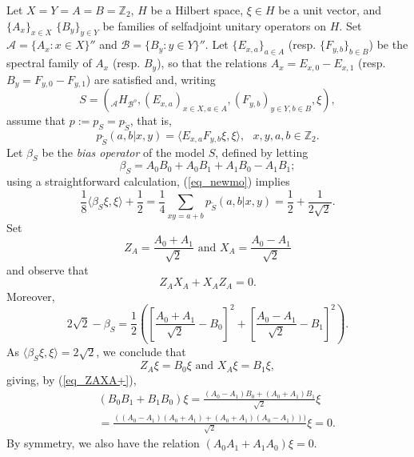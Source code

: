\documentclass[11pt]{amsart}
\theoremstyle{definition}
\newcommand{\cl}[1]{\mathcal{#1}}
\newcommand{\bb}[1]{\mathbb{#1}}
\DeclareMathOperator{\Tr}{Tr}
\begin{document}
Let $X=Y=A=B=\mathbb Z_2$, 
$H$ be a Hilbert space, $\xi\in H$ be a unit vector, 
and $\{A_x\}_{x\in X}$ $\{B_y\}_{y\in Y}$ be families of selfadjoint unitary 
operators on $H$. 
Set $\cl A=\{A_x:x\in X\}''$
and $\cl B=\{B_y:y\in Y\}''$.
Let
$\{E_{x,a}\}_{a\in A}$ (resp. $\{F_{y,b}\}_{b\in B}$) be the 
spectral family of $A_x$ (resp. $B_y$), so that the relations
$A_x=E_{x,0}-E_{x,1}$ (resp. $B_y=F_{y,0}-F_{y,1}$) are 
satisfied and, writing 
$$S=(\mbox{}_{\cl A}H_{\cl B^{o}}, (E_{x,a})_{x\in X,a\in A},(F_{y,b})_{y\in Y,b\in B},\xi),$$ assume that 
$p:=p_S = p_{\tilde{S}}$, that is,
\begin{equation}\label{eq_newmo}
p_{\tilde S}(a,b|x,y)=\langle E_{x,a}F_{y,b}\xi,\xi\rangle,
\ \ \ x,y,a,b\in \bb{Z}_2.
\end{equation}
Let
$\beta_{S}$  be the \emph{bias operator} of the model $S$, 
defined by letting
$$\beta_{S} = A_0 B_0+A_0B_1+A_1B_0-A_1 B_1;$$
using a straightforward calculation, (\ref{eq_newmo}) implies
$$\frac{1}{8}\langle\beta_{S}\xi,\xi\rangle+\frac{1}{2}=
\frac{1}{4}\sum_{xy = a+b} p_{\tilde S}(a,b|x,y)
=\frac{1}{2}+\frac{1}{2\sqrt{2}}.$$ 
Set 
\begin{equation}\label{eq_ZA=XA=}
Z_A=\frac{A_0+A_1}{\sqrt{2}}\text { and }X_A=\frac{A_0-A_1}{\sqrt{2}}
\end{equation}
and observe that 
\begin{equation}\label{eq_ZAXA+}
Z_AX_A+X_AZ_A=0.
\end{equation}
    Moreover, 
    $$2\sqrt{2}-\beta_{S} = \frac{1}{2}\left(\left[\frac{A_0+A_1}{\sqrt{2}}-B_0\right]^2+\left[\frac{A_0-A_1}{\sqrt{2}}- B_1\right]^2\right).$$
As $\langle \beta_{S}\xi,\xi\rangle=2\sqrt{2}$,  
we conclude that 
\begin{equation}\label{eq_ZAB0}
Z_A\xi=B_0\xi \text{ and } X_A\xi=B_1\xi,
\end{equation}
        giving, by (\ref{eq_ZAXA+}),
        \begin{eqnarray*}
            &&(B_0B_1+B_1B_0)\xi=\frac{(A_0-A_1)B_0+(A_0+A_1)B_1}{\sqrt{2}}\xi\\&&=\frac{((A_0-A_1)(A_0+A_1)+(A_0+A_1)(A_0-A_1)))}{\sqrt{2}}\xi=0.
        \end{eqnarray*}
By symmetry, we also have the relation  $(A_0A_1+A_1A_0)\xi=0$.
        
\end{document}
